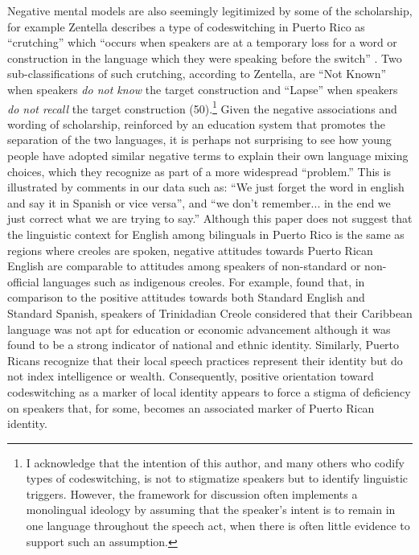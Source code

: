 \documentclass[output=paper,colorlinks,citecolor=brown]{langscibook}
\begin{document}
Negative mental models are also seemingly legitimized by some of the scholarship, for example Zentella describes a type of codeswitching in Puerto Rico as “crutching” which “occurs when speakers are at a temporary loss for a word or construction in the language which they were speaking before the switch” \citep[49]{Zentella1982}. Two sub-classifications of such crutching, according to Zentella, are “Not Known” when speakers \emph{do not know} the target construction and “Lapse” when speakers \emph{do not recall} the target construction (50).\footnote{I acknowledge that the intention of this author, and many others who codify types of codeswitching, is not to 
stigmatize speakers but to identify linguistic triggers. However, the framework for discussion often implements a 
monolingual ideology by assuming that the speaker’s intent is to remain in one language throughout the speech act, when there is often little evidence to support such an assumption.} Given the negative associations and wording of scholarship, reinforced by an education system that promotes the separation of the two languages, it is perhaps not surprising to see how young people have adopted similar negative terms to explain their own language mixing choices, which they recognize as part of a more widespread “problem.” This is illustrated by comments in our data such as: “We just forget the word in english and say it in Spanish or vice versa”, and “we don’t remember... in the end we just correct what we are trying to say.” Although this paper does not suggest that the linguistic context for English among bilinguals in Puerto Rico is the same as regions where creoles are spoken, negative attitudes towards Puerto Rican English are comparable to attitudes among speakers of non-standard or non-official languages such as indigenous creoles. For example, \citet[50]{GarciaLeon_2013} found that, in comparison to the positive attitudes towards both Standard English and Standard Spanish, speakers of Trinidadian Creole considered that their Caribbean language was not apt for education or economic advancement although it was found to be a strong indicator of national and ethnic identity. Similarly, Puerto Ricans recognize that their local speech practices represent their identity but do not index intelligence or wealth. Consequently, positive orientation toward codeswitching as a marker of local identity appears to force a stigma of deficiency on speakers that, for some, becomes an associated marker of Puerto Rican identity. 
\end{document}
